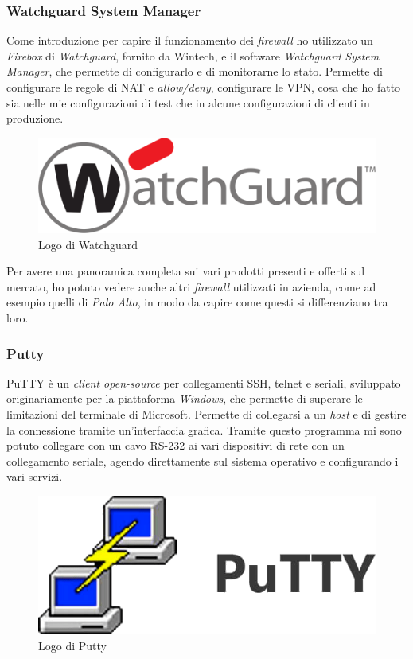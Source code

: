 \subsubsection{Watchguard System Manager}

Come introduzione per capire il funzionamento dei \emph{firewall} ho utilizzato un \emph{Firebox} di \emph{Watchguard}, fornito da Wintech, e il software \emph{Watchguard System Manager}, che permette di configurarlo e di monitorarne lo stato. Permette di configurare le regole di NAT e \emph{allow/deny}, configurare le VPN, cosa che ho fatto sia nelle mie configurazioni di test che in alcune configurazioni di clienti in produzione.

\begin{figure}[!htbp]
    \centering
    \includegraphics[width=0.6\linewidth]{images/loghi/watchguard.png}
    \caption{Logo di Watchguard}
    \label{fig:watchguard-logo}
\end{figure}

Per avere una panoramica completa sui vari prodotti presenti e offerti sul mercato, ho potuto vedere anche altri \emph{firewall} utilizzati in azienda, come ad esempio quelli di \emph{Palo Alto}, in modo da capire come questi si differenziano tra loro.

\subsubsection{Putty}

PuTTY è un \emph{client open-source} per collegamenti SSH, telnet e seriali, sviluppato originariamente per la piattaforma \emph{Windows}, che permette di superare le limitazioni del terminale di Microsoft. Permette di collegarsi a un \emph{host} e di gestire la connessione tramite un'interfaccia grafica. Tramite questo programma mi sono potuto collegare con un cavo RS-232 ai vari dispositivi di rete con un collegamento seriale, agendo direttamente sul sistema operativo e configurando i vari servizi.

\begin{figure}[!htbp]
    \centering
    \includegraphics[width=0.5\linewidth]{images/loghi/putty.png}
    \caption{Logo di Putty}
    \label{fig:putty-logo}
\end{figure}

